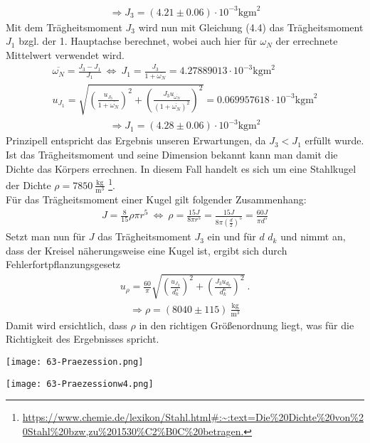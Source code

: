 \begin{align*}
    \Rightarrow\boxed{J_3=(4.21\pm0.06)\cdot10^{-3}\text{kgm}^2}
\end{align*}
Mit dem Trägheitsmoment $J_3$ wird nun mit Gleichung (4.4) das Trägheitsmoment $J_1$ bzgl. der 1. Hauptachse berechnet, wobei auch hier für $\omega_N$ der errechnete Mittelwert verwendet wird.
\begin{gather}
    \overline{\omega_N}=\frac{J_3-J_1}{J_1}~\Leftrightarrow~ J_1=\frac{J_3}{1+\overline{\omega_N}}=4.27889013\cdot 10^{-3}\text{kgm}^2\\
    u_{J_1}=\sqrt{\left(\frac{u_{J_3}}{1+\overline{\omega_N}}\right)^2+\left(\frac{J_3u_{\overline{\omega_N}}}{(1+\overline{\omega_N})^2}\right)^2}=0.069957618\cdot 10^{-3}\text{kgm}^2
\end{gather}
\begin{align*}
    \Rightarrow\boxed{J_1=(4.28\pm0.06)\cdot10^{-3}\text{kgm}^2}
\end{align*}
Prinzipell entspricht das Ergebnis unseren Erwartungen, da $J_3<J_1$ erfüllt wurde. Ist das Trägheitsmoment und seine Dimension bekannt kann man damit die Dichte das Körpers errechnen. In diesem Fall handelt es sich um eine Stahlkugel der Dichte $\rho = 7850~\frac{\text{kg}}{\text{m}^3}$ \footnote[5]{\url{https://www.chemie.de/lexikon/Stahl.html#:~:text=Die%20Dichte%20von%20Stahl%20bzw,zu%201530%C2%B0C%20betragen.}}.\\
Für das Trägheitsmoment einer Kugel gilt folgender Zusammenhang:
\begin{gather}
    J=\frac{8}{15}\rho\pi r^5 ~\Leftrightarrow~ \rho=\frac{15 J}{8\pi r^5}=\frac{15 J}{8\pi \left(\frac{d}{2}\right)^5} = \frac{60 J}{\pi d^5}
\end{gather}
Setzt man nun für $J$ das Trägheitsmoment $J_3$ ein und für $d$ $d_k$ und nimmt an, dass der Kreisel näherungsweise eine Kugel ist, ergibt sich durch Fehlerfortpflanzungsgesetz
\begin{gather}
    u_\rho = \frac{60}{\pi}\sqrt{\left(\frac{u_{J_3}}{d_k^5}\right)^2 + \left(\frac{J_3 u_{d_k}}{d_k^6}\right)^2}~.
\end{gather}
\begin{align*}
    \Rightarrow\boxed{\rho=(8040\pm115)~\frac{\text{kg}}{\text{m}^3}}
\end{align*}
Damit wird ersichtlich, dass $\rho$ in den richtigen Größenordnung liegt, was für die Richtigkeit des Ergebnisses spricht.
\newpage
\begin{center}
    \texttt{[image: 63-Praezession.png]}
\end{center}
\newpage
\begin{center}
    \texttt{[image: 63-Praezessionw4.png]}
\end{center}


